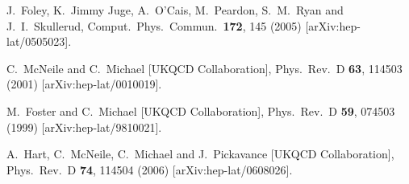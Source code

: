 \documentclass[a4paper]{article}
\begin{document}
\begin{thebibliography}{99}

  J.~Foley, K.~Jimmy Juge, A.~O'Cais, M.~Peardon, S.~M.~Ryan and J.~I.~Skullerud,
  Comput.\ Phys.\ Commun.\  {\bf 172}, 145 (2005)
  [arXiv:hep-lat/0505023].

  C.~McNeile and C.~Michael  [UKQCD Collaboration],
  Phys.\ Rev.\  D {\bf 63}, 114503 (2001)
  [arXiv:hep-lat/0010019].

  M.~Foster and C.~Michael  [UKQCD Collaboration],
  Phys.\ Rev.\  D {\bf 59}, 074503 (1999)
  [arXiv:hep-lat/9810021].

  A.~Hart, C.~McNeile, C.~Michael and J.~Pickavance  [UKQCD Collaboration],
  Phys.\ Rev.\  D {\bf 74}, 114504 (2006)
  [arXiv:hep-lat/0608026].

\end{thebibliography}
\end{document}
